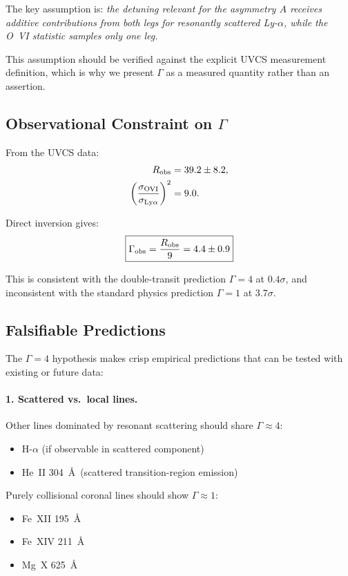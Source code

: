 The key assumption is: \emph{the detuning relevant for the asymmetry $A$ receives 
additive contributions from both legs for resonantly scattered Ly-$\alpha$, while 
the O~VI statistic samples only one leg.}

This assumption should be verified against the explicit UVCS measurement 
definition, which is why we present $\Gamma$ as a measured quantity rather 
than an assertion.

\subsection{Observational Constraint on $\Gamma$}

From the UVCS data:
\begin{align}
R_{\rm obs} &= 39.2 \pm 8.2, \\
\left(\frac{\sigma_{\rm OVI}}{\sigma_{\rm Ly\alpha}}\right)^2 &= 9.0.
\end{align}

Direct inversion gives:
\begin{equation}
\boxed{\Gamma_{\rm obs} = \frac{R_{\rm obs}}{9} = 4.4 \pm 0.9}
\end{equation}

This is consistent with the double-transit prediction $\Gamma = 4$ at $0.4\sigma$, 
and inconsistent with the standard physics prediction $\Gamma = 1$ at $3.7\sigma$.

\subsection{Falsifiable Predictions}

The $\Gamma = 4$ hypothesis makes crisp empirical predictions that can be tested 
with existing or future data:

\paragraph{1. Scattered vs.\ local lines.}
Other lines dominated by resonant scattering should share $\Gamma \approx 4$:
\begin{itemize}[nosep]
\item H-$\alpha$ (if observable in scattered component)
\item He~II 304~\AA\ (scattered transition-region emission)
\end{itemize}
Purely collisional coronal lines should show $\Gamma \approx 1$:
\begin{itemize}[nosep]
\item Fe~XII 195~\AA
\item Fe~XIV 211~\AA
\item Mg~X 625~\AA
\end{itemize}

